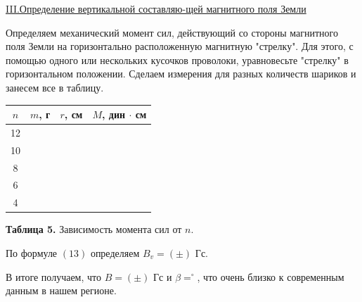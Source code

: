 \documentclass{article}
\begin{document}
\newpage

\begin{center}
    \underline{\large {\RN{3}.Определение вертикальной составляю-щей магнитного поля Земли}}
\end{center}

Определяем механический момент сил, действующий со стороны магнитного поля Земли на горизонтально расположенную магнитную "стрелку". Для этого, с помощью одного или нескольких кусочков проволоки, уравновесьте "стрелку" в горизонтальном положении. Сделаем измерения для разных количеств шариков и занесем все в таблицу.

\begin{center}
    \begin{tabular}{|c|c|c|c|}
        \hline
        $n$ & $m$, г & $r$, см & $M$, дин $\cdot$ см \\ \hline
        12 & & & \\
        \hline
        10 & & & \\
        \hline
        8 & & & \\
        \hline
        6 & & & \\
        \hline
        4 & & & \\
        \hline
    \end{tabular}
    
    \textbf{Таблица 5.} Зависимость момента сил от $n$.
\end{center}

По формуле $(13)$ определяем $B_v = ( \pm )$ Гс.

В итоге получаем, что $B = (\pm)$ Гс и $\beta = ^{\circ}$, что очень близко к современным данным в нашем регионе.
\end{document}
